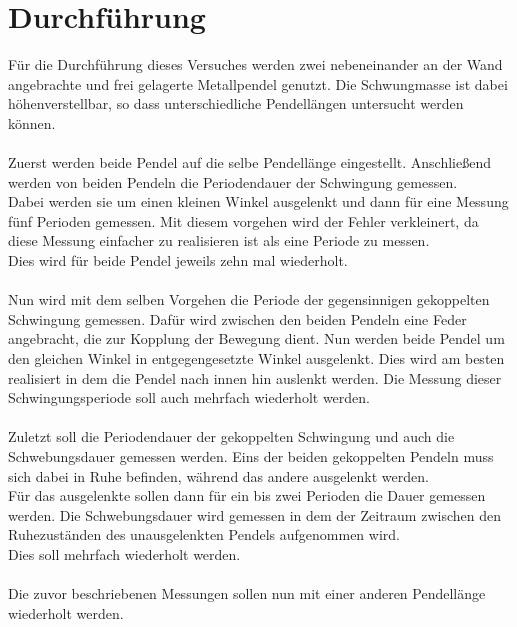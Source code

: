 \newpage
\section{Durchführung}
Für die Durchführung dieses Versuches werden zwei nebeneinander an der Wand angebrachte und frei gelagerte Metallpendel genutzt. 
Die Schwungmasse ist dabei höhenverstellbar, so dass unterschiedliche Pendellängen untersucht werden können.\\\\
Zuerst werden beide Pendel auf die selbe Pendellänge eingestellt. Anschließend werden von beiden Pendeln die Periodendauer der Schwingung gemessen.\\
Dabei werden sie um einen kleinen Winkel ausgelenkt und dann für eine Messung fünf Perioden gemessen. 
Mit diesem vorgehen wird der Fehler verkleinert, da diese Messung einfacher zu realisieren ist als eine Periode zu messen.\\
Dies wird für beide Pendel jeweils zehn mal wiederholt.\\\\
Nun wird mit dem selben Vorgehen die Periode der gegensinnigen gekoppelten Schwingung gemessen. 
Dafür wird zwischen den beiden Pendeln eine Feder angebracht, die zur Kopplung der Bewegung dient.
Nun werden beide Pendel um den gleichen Winkel in entgegengesetzte Winkel ausgelenkt. Dies wird am besten realisiert in dem die Pendel nach innen hin auslenkt werden. 
Die Messung dieser Schwingungsperiode soll auch mehrfach wiederholt werden.\\\\
Zuletzt soll die Periodendauer der gekoppelten Schwingung und auch die Schwebungsdauer gemessen werden. 
Eins der beiden gekoppelten Pendeln muss sich dabei in Ruhe befinden, während das andere ausgelenkt werden. \\
Für das ausgelenkte sollen dann für ein bis zwei Perioden die Dauer gemessen werden.
Die Schwebungsdauer wird gemessen in dem der Zeitraum zwischen den Ruhezuständen des unausgelenkten Pendels aufgenommen wird.\\
Dies soll mehrfach wiederholt werden.\\\\

\noindent
Die zuvor beschriebenen Messungen sollen nun mit einer anderen Pendellänge wiederholt werden.




